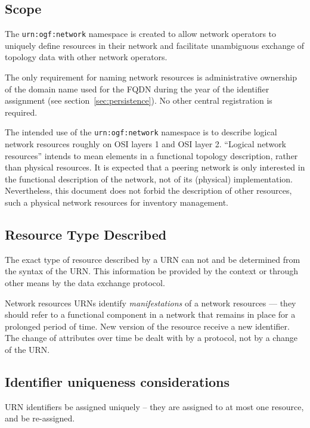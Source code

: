 \documentclass[12pt]{article}  %
\begin{document}
\subsection{Scope}

The \texttt{urn:ogf:network} namespace is created to allow network 
operators to uniquely define resources in their network and facilitate 
unambiguous exchange of topology data with other network operators.

The only requirement for naming network resources is administrative 
ownership of the domain name used for the FQDN during the year of the identifier assignment (see section~\ref{sec:persistence}). 
No other central registration is required.

The intended use of the \texttt{urn:ogf:network} namespace is to describe 
logical network resources roughly on OSI layers 1 and OSI layer 2. 
“Logical network resources” intends to mean elements in a functional topology 
description, rather than physical resources. It is expected that a peering 
network is only interested in the functional description of the network, 
not of its (physical) implementation. Nevertheless, this document does 
not forbid the description of other resources, such a physical network 
resources for inventory management.

\subsection{Resource Type Described}

The exact type of resource described by a URN can not and \MUSTNOT{} be 
determined from the syntax of the URN. This information \MUST{} be provided 
by the context or through other means by the data exchange protocol.

Network resources URNs \SHOULD{} identify \emph{manifestations} of a 
network resources --- they should refer to a functional component in a 
network that remains in place for a prolonged period of time. 
New version of the resource \SHOULDNOT{} receive a new identifier.
The change of attributes over time \SHOULD{} be dealt with by a protocol, 
not by a change of the URN.

\subsection{Identifier uniqueness considerations}

URN identifiers \MUST{} be assigned uniquely -- they are assigned to 
at most one resource, and \MUSTNOT{} be re-assigned.
\end{document}
